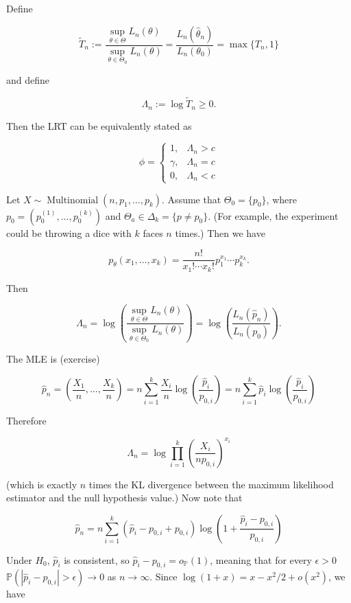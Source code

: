 Define

\[
\tilde{T}_n :=  \frac{\sup_{\theta \in \Theta} L_n(\theta)}{\sup_{\theta \in \Theta_0} L_n(\theta)} = \frac{L_n (\hat{\theta}_n)}{L_n (\theta_0)}  = \max\{T_n, 1\}
\]

and define

\[
\Lambda_n := \log \tilde{T}_n \geq 0.
\]

Then the LRT can be equivalently stated as 

\[
\phi = \begin{cases}
1, & \Lambda_n > c\\
\gamma, & \Lambda_n = c \\
0, & \Lambda_n < c
\end{cases}
\]

\begin{example}\label{mathstats.ex.lrt.multinomial}

Let \(X \sim \operatorname{Multinomial}(n, p_1, \ldots, p_k)\). Assume that \(\Theta_0 = \{p_0\}\), where \(p_0 = (p_0^{(1)}, \ldots, p_0^{(k)})\) and \(\Theta_a \in \Delta_k = \{p \neq p_0\}\). (For example, the experiment could be throwing a dice with \(k\) faces \(n\) times.) Then we have

\[
p_\theta(x_1, \ldots, x_k) = \frac{n!}{x_1! \cdots x_k!} p_1^{x_1} \cdots p_k^{x_k}.
\]

Then 

\[
\Lambda_n =  \log \left( \frac{\sup_{\theta \in \Theta} L_n(\theta)}{\sup_{\theta \in \Theta_0} L_n(\theta)} \right) =   \log \left( \frac{L_n (\hat{p}_n)}{L_n (p_0)}  \right).
\]

The MLE is (exercise)

\[
\hat{p}_n = \left( \frac{X_1}{n}, \ldots, \frac{X_k}{n} \right) = n \sum_{i=1}^k \frac{X_i}{n} \log \left( \frac{\hat{p}_i}{p_{0,i}} \right) = n \sum_{i=1}^k \hat{p}_i \log \left(  \frac{ \hat{p}_i}{p_{0,i}} \right)
\]

Therefore

\[
\Lambda_n = \log \prod_{i=1}^k  \left(  \frac{X_i}{n p_{0,i}} \right)^{x_i}
\]

(which is exactly \(n\) times the KL divergence between the maximum likelihood estimator and the null hypothesis value.) Now note that

\[
\hat{p}_n =n \sum_{i=1}^k (\hat{p}_i - p_{0,i} + p_{0,i}) \log \left(  1 + \frac{ \hat{p}_i - p_{0,i}}{p_{0,i}} \right)
\]

Under \(H_0\), \(\hat{p}_i\) is consistent, so \(\hat{p}_i - p_{0,i} = o_{\mathbb{P}}(1)\), meaning that for every \(\epsilon > 0\) \(\mathbb{P}(|\hat{p}_i - p_{0,i}| > \epsilon) \to 0 \) as \(n \to \infty\). Since \(\log(1 + x) = x - x^2/2 + o(x^2)\), we have


\end{example}
